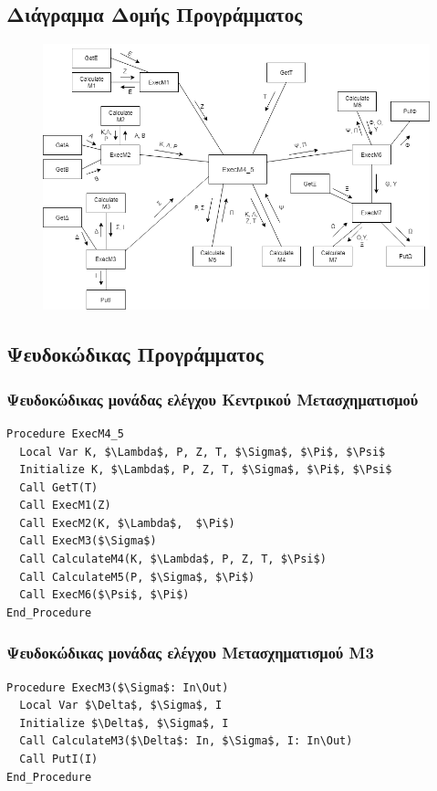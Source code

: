 \documentclass{article}
\begin{document}
\subsection{Διάγραμμα Δομής Προγράμματος}
\begin{figure}[!h]
	\includegraphics[width=14cm]{../Structured_Design/ddp.png}
\end{figure}

\newpage
\subsection{Ψευδοκώδικας Προγράμματος}
\subsubsection{Ψευδοκώδικας μονάδας ελέγχου Κεντρικού Μετασχηματισμού}
\begin{lstlisting}[mathescape]
Procedure ExecM4_5
  Local Var K, $\Lambda$, P, Z, T, $\Sigma$, $\Pi$, $\Psi$
  Initialize K, $\Lambda$, P, Z, T, $\Sigma$, $\Pi$, $\Psi$
  Call GetT(T)
  Call ExecM1(Z)
  Call ExecM2(K, $\Lambda$,  $\Pi$)
  Call ExecM3($\Sigma$)
  Call CalculateM4(K, $\Lambda$, P, Z, T, $\Psi$)
  Call CalculateM5(P, $\Sigma$, $\Pi$)
  Call ExecM6($\Psi$, $\Pi$)
End_Procedure
\end{lstlisting}

\subsubsection{Ψευδοκώδικας μονάδας ελέγχου Μετασχηματισμού Μ3}
\begin{lstlisting}[mathescape]
Procedure ExecM3($\Sigma$: In\Out)
  Local Var $\Delta$, $\Sigma$, I
  Initialize $\Delta$, $\Sigma$, I
  Call CalculateM3($\Delta$: In, $\Sigma$, I: In\Out)
  Call PutI(I)
End_Procedure
\end{lstlisting}
\end{document}
